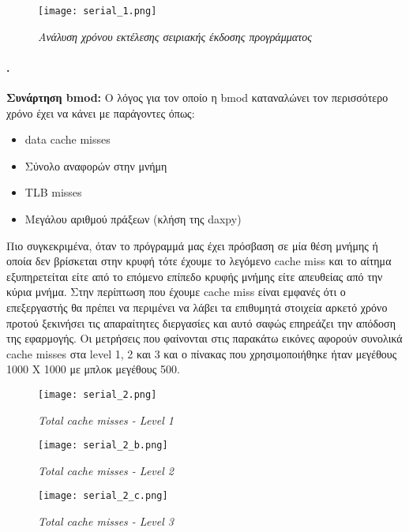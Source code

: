 \documentclass[greek,booktabs,8pt,flagBlueCMYK]{report}
\begin{document}
\begin{figure}[ht]
\centering
\texttt{[image: serial\_1.png]}
\caption{\textit{Ανάλυση χρόνου εκτέλεσης σειριακής έκδοσης προγράμματος}}
\label{fig:serial_1}
\end{figure}

\clearpage
\paragraph{.} \textbf{Συνάρτηση bmod:}\newline
Ο λόγος για τον οποίο η bmod καταναλώνει τον περισσότερο χρόνο έχει να κάνει με παράγοντες όπως:
\begin{itemize}
  \item data cache misses
  \item Σύνολο αναφορών στην μνήμη
  \item TLB misses
  \item Μεγάλου αριθμού πράξεων (κλήση της daxpy)
\end{itemize}
Πιο συγκεκριμένα, όταν το πρόγραμμά μας έχει πρόσβαση σε μία θέση μνήμης ή οποία δεν βρίσκεται στην κρυφή τότε έχουμε το λεγόμενο cache miss και το αίτημα εξυπηρετείται είτε από το επόμενο επίπεδο κρυφής μνήμης είτε απευθείας από την κύρια μνήμα. Στην περίπτωση που έχουμε cache miss είναι εμφανές ότι ο επεξεργαστής θα πρέπει να περιμένει να λάβει τα επιθυμητά στοιχεία αρκετό χρόνο προτού ξεκινήσει τις απαραίτητες διεργασίες και αυτό σαφώς επηρεάζει την απόδοση της εφαρμογής. Οι μετρήσεις που φαίνονται στις παρακάτω εικόνες αφορούν συνολικά cache misses στα level 1, 2 και 3 και ο πίνακας που χρησιμοποιήθηκε ήταν μεγέθους 1000 Χ 1000 με μπλοκ μεγέθους 500.

\begin{figure}[ht]
\centering
\texttt{[image: serial\_2.png]}
\caption{\textit{Total cache misses - Level 1}}
\label{fig:serial_2}
\end{figure}

\clearpage

\begin{figure}[ht]
\centering
\texttt{[image: serial\_2\_b.png]}
\caption{\textit{Total cache misses - Level 2}}
\label{fig:serial_2_b}
\end{figure}

\begin{figure}[ht]
\centering
\texttt{[image: serial\_2\_c.png]}
\caption{\textit{Total cache misses - Level 3}}
\label{fig:serial_2_c}
\end{figure}
\end{document}
